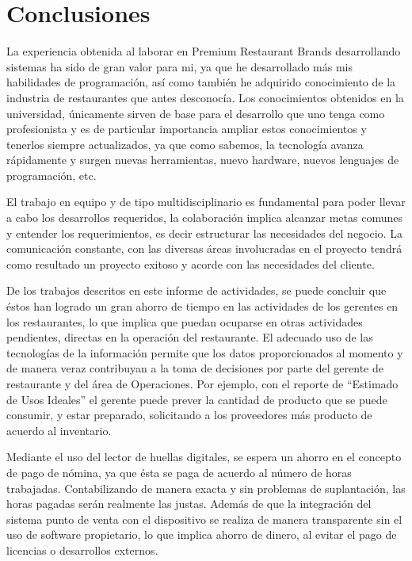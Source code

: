 
\chapter*{Conclusiones}
\label{chap:conclusiones}

La experiencia obtenida al laborar en Premium Restaurant Brands desarrollando sistemas ha sido de gran valor para mi, ya que he desarrollado más mis habilidades de programación, así como también he adquirido conocimiento de la industria de restaurantes que antes desconocía. Los conocimientos obtenidos en la universidad, únicamente sirven de base para el desarrollo que uno tenga como profesionista y es de particular importancia ampliar estos conocimientos y tenerlos siempre actualizados, ya que como sabemos, la tecnología avanza rápidamente y surgen nuevas herramientas, nuevo hardware, nuevos lenguajes de programación, etc.

El trabajo en equipo y de tipo multidisciplinario es fundamental para poder llevar a cabo los desarrollos requeridos, la colaboración implica alcanzar metas comunes y entender los requerimientos, es decir estructurar las necesidades del negocio. La comunicación constante, con las diversas áreas involucradas en el proyecto tendrá como resultado un proyecto exitoso y acorde con las necesidades del cliente.

De los trabajos descritos en este informe de actividades, se puede concluir que éstos han logrado un gran ahorro de tiempo en las actividades de los gerentes en los restaurantes, lo que implica que puedan ocuparse en otras actividades pendientes, directas en la operación del restaurante. El adecuado uso de las tecnologías de la información permite que los datos proporcionados al momento y de manera veraz contribuyan a la toma de decisiones por parte del gerente de restaurante y del área de Operaciones. Por ejemplo, con el reporte de ``Estimado de Usos Ideales'' el gerente puede prever la cantidad de producto que se puede consumir, y estar preparado, solicitando a los proveedores más producto de acuerdo al inventario.

Mediante el uso del lector de huellas digitales, se espera un ahorro en el concepto de pago de nómina, ya que ésta se paga de acuerdo al número de horas trabajadas. Contabilizando de manera exacta y sin problemas de suplantación, las horas pagadas serán realmente las justas. Además de que la integración del sistema punto de venta con el dispositivo se realiza de manera transparente sin el uso de software propietario, lo que implica ahorro de dinero, al evitar el pago de licencias o desarrollos externos.

